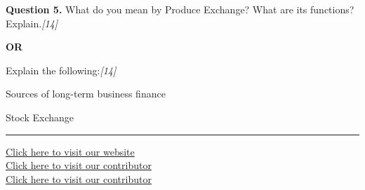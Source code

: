 \documentclass[11pt,a4paper]{article}
\newcommand{\pts}[1]{\hfill   \textit{[#1]}}
\begin{document}
\noindent   \textbf{Question 5.}
What do you mean by Produce Exchange? What are its functions? Explain.\pts{14}

\centerline{   \textbf{OR}}

Explain the following:\pts{14}

\begin{parts}
  \item Sources of long-term business finance
  \item Stock Exchange
\end{parts}

\vfill
\rule{\linewidth}{0.4pt}

\begin{center}\small
\href{https://bhu-exam.vercel.app/}{Click here to visit our website}\\[4pt]
\href{https://me-aryan.vercel.app/}{Click here to visit our contributor}\\[4pt]
\href{https://quashan-me.vercel.app/}{Click here to visit our contributor}
\end{center}
\end{document}
